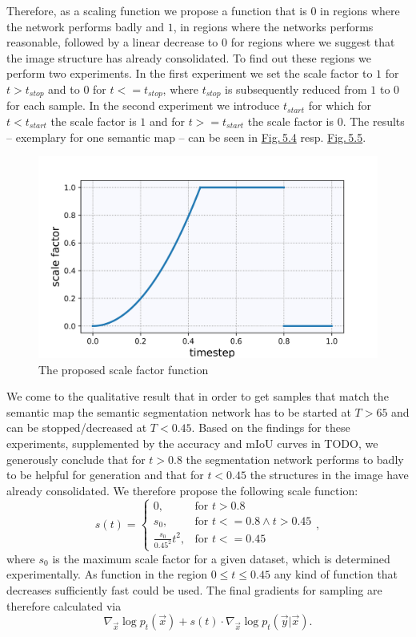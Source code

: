 Therefore, as a scaling function we propose a function that is $0$ in regions where the network performs badly and $1$, in regions where the networks performs reasonable, followed by a linear decrease to $0$ for regions where we suggest that the image structure has already consolidated. To find out these regions we perform two experiments. In the first experiment we set the scale factor to $1$ for $t>t_{stop}$ and to $0$ for $t<=t_{stop}$, where $t_{stop}$ is subsequently reduced from $1$ to $0$ for each sample. In the second experiment we introduce $t_{start}$ for which for $t<t_{start}$ the scale factor is $1$ and for $t>=t_{start}$ the scale factor is $0$. The results – exemplary for one semantic map – can be seen in \hyperref[fig:5.4]{Fig.\,5.4} resp. \hyperref[fig:5.5]{Fig.\,5.5}.

%
\begin{figure} \label{fig:5.2}
    \centering
    \includegraphics[width=.65\textwidth]{Chapters/figures/experiments/scale/scale_function.jpg}
    \caption{The proposed scale factor function}
\end{figure}
%
We come to the qualitative result that in order to get samples that match the semantic map the semantic segmentation network has to be started at $T>65$ and can be stopped/decreased at $T<0.45$.  Based on the findings for these experiments, supplemented by the accuracy and mIoU curves in TODO, we generously conclude that for $t>0.8$ the segmentation network performs to badly to be helpful for generation and that for $t<0.45$ the structures in the image have already consolidated. We therefore propose the following scale function:
%
\begin{equation}
    s(t)=\begin{cases}
        0, &\text{for }t>0.8\\
        s_0, &\text{for }t<=0.8 \land t>0.45\\
        \frac{s_0}{0.45^2}t^2, &\text{for }t<=0.45
    \end{cases},
\end{equation}
%
where $s_0$ is the maximum scale factor for a given dataset, which is determined experimentally. As function in the region $0\leq t\leq0.45$ any kind of function that decreases sufficiently fast could be used. The final gradients for sampling are therefore calculated via
%
\begin{equation}
    \nabla_{\vec{x}}\log p_t(\vec{x})+s(t)\cdot\nabla_{\vec{x}}\log p_t(\vec{y}|\vec{x}).
\end{equation}

